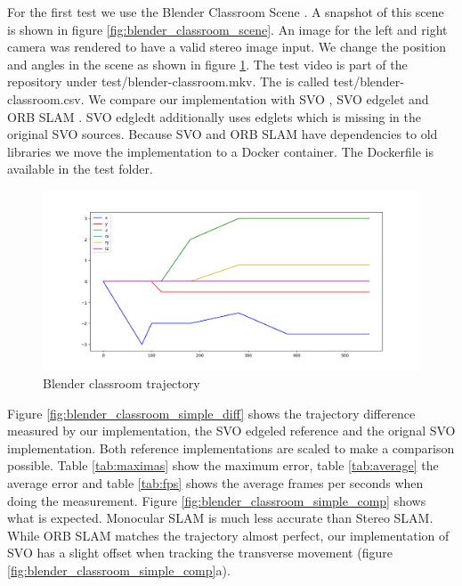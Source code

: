 \documentclass[11pt,a4paper,titlepage,oneside]{report}
\begin{document}
For the first test we use the Blender Classroom Scene \cite{blender}. A snapshot of this scene is shown in figure \ref{fig:blender_classroom_scene}. An image for the left and right camera was rendered to have a valid stereo image input. We change the position and angles in the scene as shown in figure \ref{fig:blender_classroom_simple_traj}. The test video is part of the repository under test/blender-classroom.mkv. The is called test/blender-classroom.csv. We compare our implementation with SVO \cite{svo}, SVO edgelet \cite{svo_edglet} and ORB SLAM \cite{orbslam}. SVO edgledt additionally uses edglets which is missing in the original SVO sources. Because SVO and ORB SLAM have dependencies to old libraries we move the implementation to a Docker container. The Dockerfile is available in the test folder.

\begin{figure}[H]
  \centering
  \includegraphics[width=1.0\textwidth]{img/blender_classroom_simple_traj.png}
  \caption{Blender classroom trajectory}\label{fig:blender_classroom_simple_traj}
\end{figure}

Figure \ref{fig:blender_classroom_simple_diff} shows the trajectory difference measured by our implementation, the SVO edgeled reference and the orignal SVO implementation. Both reference implementations are scaled to make a comparison possible. Table \ref{tab:maximas} show the maximum error, table \ref{tab:average} the average error and table \ref{tab:fps} shows the average frames per seconds when doing the measurement. Figure \ref{fig:blender_classroom_simple_comp} shows what is expected. Monocular SLAM is much less accurate than Stereo SLAM. While ORB SLAM matches the trajectory almost perfect, our implementation of SVO has a slight offset when tracking the transverse movement (figure \ref{fig:blender_classroom_simple_comp}a).
\end{document}
